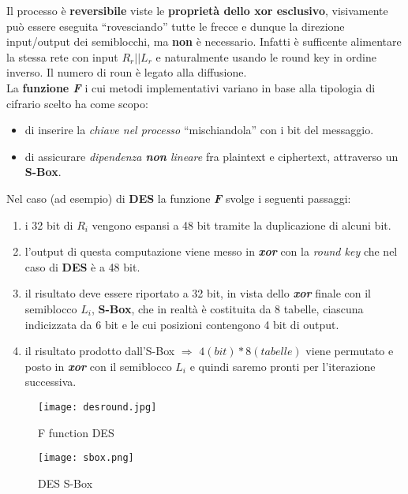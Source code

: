 Il processo è \textbf{reversibile} viste le \textbf{proprietà dello xor esclusivo}, visivamente può essere eseguita ``rovesciando'' tutte le frecce e dunque la direzione input/output dei semiblocchi, ma \textbf{non} è necessario. Infatti è sufficente alimentare la stessa rete con input $R_r||L_r$ e naturalmente usando le round key in ordine inverso. Il numero di roun è legato alla diffusione.
\\ \newline
La \textbf{funzione \textit{F}} i cui metodi implementativi variano in base alla tipologia di cifrario scelto ha come scopo:
\begin{itemize}
    \item di inserire la \textit{chiave nel processo} ``mischiandola'' con i bit del messaggio.
    \item di assicurare \textit{dipendenza \textbf{non} lineare} fra plaintext e ciphertext, attraverso un \textbf{S-Box}.
\end{itemize}
Nel caso (ad esempio) di \textbf{DES} la funzione \textbf{\textit{F}} svolge i seguenti passaggi:
\begin{enumerate}
    \item i 32 bit di $R_i$ vengono espansi a 48 bit tramite la duplicazione di alcuni bit.
    \item l'output di questa computazione viene messo in \textbf{\textit{xor}} con la \textit{round key} che nel caso di \textbf{DES} è a 48 bit.
    \item il risultato deve essere riportato a 32 bit, in vista dello \textbf{\textit{xor}} finale con il semiblocco $L_i$, \textbf{S-Box}, che in realtà è costituita da 8 tabelle, ciascuna indicizzata da 6 bit e le cui posizioni contengono 4 bit di output.
    \item il risultato prodotto dall'S-Box $\Rightarrow$ $4 (bit) * 8 (tabelle)$ viene permutato e posto in \textbf{\textit{xor}} con il semiblocco $L_i$ e quindi saremo pronti per l'iterazione successiva.
\end{enumerate}

\begin{figure}[h]
    \centering
    \begin{minipage}[t]{0.45\textwidth}
        \centering
        \texttt{[image: desround.jpg]}
        \caption{F function DES}
    \end{minipage}
    \hfill
    \begin{minipage}[t]{0.45\textwidth}
        \centering
        \texttt{[image: sbox.png]}
        \caption{DES S-Box}
    \end{minipage}
\end{figure}

